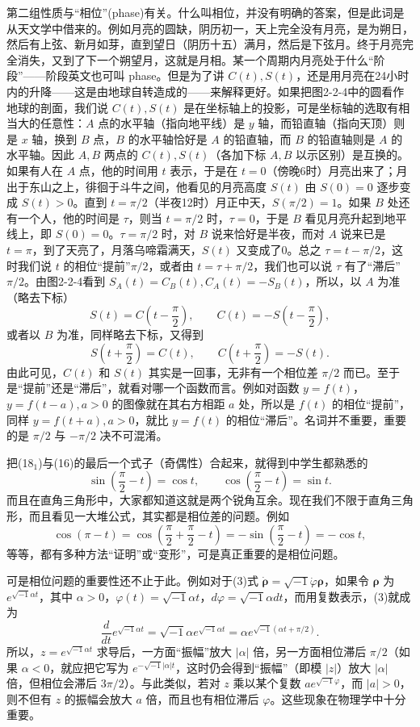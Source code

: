 第二组性质与“相位”(phase)有关。什么叫相位，并没有明确的答案，但是此词是从天文学中借来的。例如月亮的圆缺，阴历初一，天上完全没有月亮，是为朔日，然后有上弦、新月如芽，直到望日（阴历十五）满月，然后是下弦月。终于月亮完全消失，又到了下一个朔望月，这就是月相。某一个周期内月亮处于什么“阶段”——阶段英文也可叫 phase。但是为了讲 $C(t),S(t)$，还是用月亮在24小时内的升降——这是由地球自转造成的——来解释更好。如果把图2-2-4中的圆看作地球的剖面，我们说 $C(t),S(t)$ 是在坐标轴上的投影，可是坐标轴的选取有相当大的任意性：$A$ 点的水平轴（指向地平线）是 $y$ 轴，而铅直轴（指向天顶）则是 $x$ 轴，换到 $B$ 点，$B$ 的水平轴恰好是 $A$ 的铅直轴，而 $B$ 的铅直轴则是 $A$ 的水平轴。因此 $A,B$ 两点的 $C(t),S(t)$（各加下标 $A,B$ 以示区别）是互换的。如果有人在 $A$ 点，他的时间用 $t$ 表示，于是在 $t=0$（傍晚6时）月亮出来了；月出于东山之上，徘徊于斗牛之间，他看见的月亮高度 $S(t)$ 由 $S(0)=0$ 逐步变成 $S(t)>0$。直到 $t=\pi/2$（半夜12时）月正中天，$S(\pi/2)=1$。如果 $B$ 处还有一个人，他的时间是 $\tau$，则当 $t=\pi/2$ 时，$\tau=0$，于是 $B$ 看见月亮升起到地平线上，即 $S(0)=0$。$\tau=\pi/2$ 时，对 $B$ 说来恰好是半夜，而对 $A$ 说来已是 $t=\pi$，到了天亮了，月落乌啼霜满天，$S(t)$ 又变成了0。总之 $\tau=t-\pi/2$，这时我们说 $t$ 的相位“提前”$\pi/2$，或者由 $t=\tau+\pi/2$，我们也可以说 $\tau$ 有了“滞后”$\pi/2$。由图2-2-4看到 $S_A(t)=C_B(t),C_A(t)=-S_B(t)$，所以，以 $A$ 为准（略去下标）
\[
S(t)=C\left(t-\frac\pi2\right),\qquad C(t)=-S\left(t-\frac\pi2\right), \tag{18$_1$}
\]
或者以 $B$ 为准，同样略去下标，又得到
\[
S\left(t+\frac\pi2\right)=C(t),\qquad C\left(t+\frac\pi2\right)=-S(t). \tag{18$_2$}
\]
由此可见，$C(t)$ 和 $S(t)$ 其实是一回事，无非有一个相位差 $\pi/2$ 而已。至于是“提前”还是“滞后”，就看对哪一个函数而言。例如对函数 $y=f(t)$，$y=f(t-a),a>0$ 的图像就在其右方相距 $a$ 处，所以是 $f(t)$ 的相位“提前”，同样 $y=f(t+a),a>0$，就比 $y=f(t)$ 的相位“滞后”。名词并不重要，重要的是 $\pi/2$ 与 $-\pi/2$ 决不可混淆。

把(18$_1$)与(16)的最后一个式子（奇偶性）合起来，就得到中学生都熟悉的
\[
\sin\left(\frac\pi2-t\right)=\cos t,\qquad \cos\left(\frac\pi2-t\right)=\sin t.
\]
而且在直角三角形中，大家都知道这就是两个锐角互余。现在我们不限于直角三角形，而且看见一大堆公式，其实都是相位差的问题。例如
\[
\cos(\pi-t)=\cos\left(\frac\pi2+\frac\pi2-t\right)
=-\sin\left(\frac\pi2-t\right)=-\cos t,
\]
等等，都有多种方法“证明”或“变形”，可是真正重要的是相位问题。

可是相位问题的重要性还不止于此。例如对于(3)式 $\dot{\boldsymbol\rho}=\sqrt{-1}\dot\varphi\boldsymbol\rho$，如果令 $\boldsymbol\rho$ 为 $e^{\sqrt{-1}\alpha t}$，其中 $\alpha>0$，$\varphi(t)=\sqrt{-1}\alpha t$，$d\varphi=\sqrt{-1}\alpha dt$，而用复数表示，(3)就成为
\[
\frac d{dt}e^{\sqrt{-1}\alpha t}=\sqrt{-1}\alpha e^{\sqrt{-1}\alpha t}
=\alpha e^{\sqrt{-1}(\alpha t+\pi/2)}. \tag{19}
\]
所以，$z=e^{\sqrt{-1}\alpha t}$ 求导后，一方面“振幅”放大 $|\alpha|$ 倍，另一方面相位滞后 $\pi/2$（如果 $\alpha<0$，就应把它写为 $e^{-\sqrt{-1}|\alpha|t}$，这时仍会得到“振幅”（即模 $|z|$）放大 $|\alpha|$ 倍，但相位会滞后 $3\pi/2$）。与此类似，若对 $z$ 乘以某个复数 $ae^{\sqrt{-1}\varphi}$，而 $|a|>0$，则不但有 $z$ 的振幅会放大 $a$ 倍，而且也有相位滞后 $\varphi$。这些现象在物理学中十分重要。

